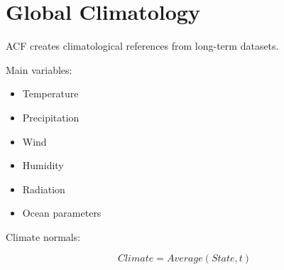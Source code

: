 \section{Global Climatology}


ACF creates climatological references from long-term datasets.



Main variables:


\begin{itemize}

\item Temperature

\item Precipitation

\item Wind

\item Humidity

\item Radiation

\item Ocean parameters

\end{itemize}



Climate normals:


\[
Climate =
Average(State,t)
\]
